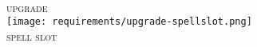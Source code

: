 \vspace{-4mm}
\centering{\rule{\textwidth}{0.7pt}}\\

\begin{minipage}[t]{\textwidth}
	\scriptsize
	\begin{minipage}[c]{0.2\textwidth}
		\vspace{1mm}
		\centering
		\textsc{upgrade}\\
		\texttt{[image: requirements/upgrade-spellslot.png]}\\
		\tiny\textsc{spell slot}
	\end{minipage}
	\begin{minipage}[c]{0.75\textwidth}
		\vspace{1mm}
	\end{minipage}
\end{minipage}
